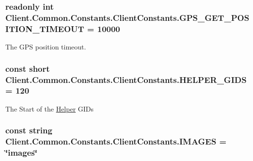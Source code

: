 \subsubsection[{G\+P\+S\+\_\+\+G\+E\+T\+\_\+\+P\+O\+S\+I\+T\+I\+O\+N\+\_\+\+T\+I\+M\+E\+O\+U\+T}]{\setlength{\rightskip}{0pt plus 5cm}readonly int Client.\+Common.\+Constants.\+Client\+Constants.\+G\+P\+S\+\_\+\+G\+E\+T\+\_\+\+P\+O\+S\+I\+T\+I\+O\+N\+\_\+\+T\+I\+M\+E\+O\+U\+T = 10000\hspace{0.3cm}{\ttfamily [static]}}\label{classClient_1_1Common_1_1Constants_1_1ClientConstants_a8ec46ade3cfdee589d0c436c9aa1e714}


The G\+P\+S position timeout. 

\hypertarget{classClient_1_1Common_1_1Constants_1_1ClientConstants_abdbce6edd33fb85723b04b8338fa9ba8}{}
\subsubsection[{H\+E\+L\+P\+E\+R\+\_\+\+G\+I\+D\+S}]{\setlength{\rightskip}{0pt plus 5cm}const short Client.\+Common.\+Constants.\+Client\+Constants.\+H\+E\+L\+P\+E\+R\+\_\+\+G\+I\+D\+S = 120}\label{classClient_1_1Common_1_1Constants_1_1ClientConstants_abdbce6edd33fb85723b04b8338fa9ba8}


The Start of the \hyperlink{namespaceClient_1_1Common_1_1Helper}{Helper} G\+I\+Ds 

\hypertarget{classClient_1_1Common_1_1Constants_1_1ClientConstants_a6caf05ca06a1a0cb2126af856408cec5}{}
\subsubsection[{I\+M\+A\+G\+E\+S}]{\setlength{\rightskip}{0pt plus 5cm}const string Client.\+Common.\+Constants.\+Client\+Constants.\+I\+M\+A\+G\+E\+S = \char`\"{}images\char`\"{}}\label{classClient_1_1Common_1_1Constants_1_1ClientConstants_a6caf05ca06a1a0cb2126af856408cec5}


